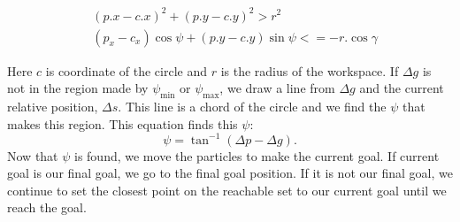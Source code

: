 \begin{align}\label{eq:ifinchord}
&(p.x - c.x)^2 + (p.y - c.y)^2  > r^2\\ \nonumber
 &(p_x - c_x) \cos\psi + (p.y- c.y) \sin\psi <= -r. \cos\gamma
\end{align}

Here $c$ is coordinate of the circle and $r$ is the radius of the workspace.
 If $\Delta g$ is not in the region made by $\psi_{\min}$ or $\psi_{\max}$, we draw a line from $\Delta g$ and the current relative position, $\Delta s$. This line is a chord of the circle and we find the $\psi$ that makes this region. This equation finds this $\psi$:
  \begin{equation}
 \psi = \tan^{-1}(\Delta p - \Delta g ).
 \end{equation}
 Now that $\psi$ is found, we move the particles to make the current goal. If current goal is our final goal, we go to the final goal position. If it is not our final goal, we continue to set the closest point on the reachable set to our current goal until we reach the goal. 
 
% 
 

   

